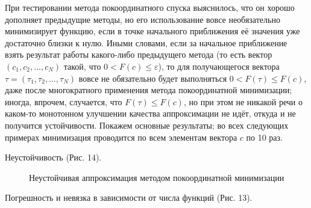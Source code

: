 ﻿\documentclass[a4paper, 12pt]{article}
\begin{document}
При тестировании метода покоординатного спуска выяснилось, что он хорошо дополняет предыдущие методы, но его использование вовсе необязательно минимизирует функцию, если в точке начального приближения её значения уже достаточно близки к нулю. Иными словами, если за начальное приближение взять результат работы какого-либо предыдущего метода (то есть вектор $\left(c_1,c_2,\dots ,c_N\right)$ такой, что $0<F\left(c\right)\le \varepsilon $), то для получающегося вектора $\tau =\left({\tau }_1,{\tau }_2,\dots ,{\tau }_N\right)$ вовсе не обязательно будет выполняться $0<F\left(\tau \right)\le F\left(c\right)$, даже после многократного применения метода покоординатной минимизации; иногда, впрочем, случается, что $F\left(\tau \right)\le F\left(c\right)$, но при этом не никакой речи о каком-то монотонном улучшении качества аппроксимации не идёт, откуда и не получится устойчивости. Покажем основные результаты; во всех следующих примерах минимизация проводится по всем элементам вектора $c$ по 10 раз.

Неустойчивость (Рис. 14).

\begin{figure}[h!]
    \noindent{}
   \caption{Неустойчивая аппроксимация методом покоординатной минимизации}
    \label{figCurves}
\end{figure}

Погрешность и невязка в зависимости от числа функций (Рис. 13).
\end{document}
